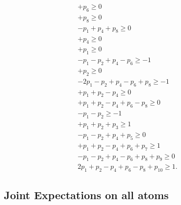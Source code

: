 \documentclass[%
  twocolumn,
 showpacs,
 showkeys,
 preprintnumbers,
 amsmath,amssymb,
 aps,
  pra,
  longbibliography,
 floatfix,
 ]{revtex4-1}
\begin{document}
\begin{eqnarray}
                                    + p_6                                    \ge           0       \\
                                                  + p_8                      \ge           0       \\
  - p_1               + p_4                       + p_8                      \ge           0       \\
                      + p_4                                                  \ge           0       \\
  + p_1                                                                      \ge           0       \\
  - p_1 - p_2         + p_4         - p_6                                    \ge           -1      \\
        + p_2                                                                \ge           0       \\
  -2p_1 - p_2         + p_4         - p_6         + p_8                      \ge           -1      \\
  + p_1 + p_2         - p_4                                                  \ge           0       \\
  + p_1 + p_2         - p_4         + p_6         - p_8                      \ge           0       \\
  - p_1 - p_2                                                                \ge           -1      \\
  + p_1 + p_2  + p_3                                                         \ge           1       \\
  - p_1 - p_2         + p_4  + p_5                                           \ge           0       \\
  + p_1 + p_2         - p_4         + p_6  + p_7                             \ge           1       \\
  - p_1 - p_2         + p_4         - p_6         + p_8  + p_9               \ge           0       \\
   2p_1 + p_2         - p_4         + p_6         - p_8         + p_{10}     \ge           1
.
\label{2017-b-kl-p-c}
\end{eqnarray}


\subsection{Joint Expectations on all atoms}
\end{document}
